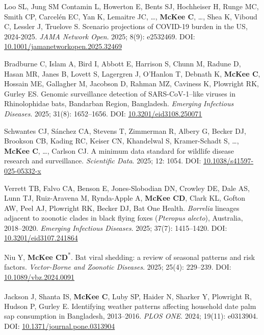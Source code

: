 \documentclass{cv}
\begin{document}
\begin{pubenum}
\item Loo SL, Jung SM Contamin L, Howerton E, Bents SJ, Hochheiser H, Runge MC, Smith CP, Carcelén EC, Yan K, Lemaitre JC, …, \textbf{McKee C}, …,  Shea K, Viboud C, Lessler J, Truelove S. Scenario projections of COVID-19 burden in the US, 2024-2025. \textit{JAMA Network Open}. 2025; 8(9): e2532469. DOI: \href{https://doi.org/10.1001/jamanetworkopen.2025.32469}{10.1001/jamanetworkopen.2025.32469}

\item Bradburne C, Islam A, Bird I, Abbott E, Harrison S, Chunn M, Radune D, Hasan MR, Janes B, Lovett S, Lagergren J, O'Hanlon T, Debnath K, \textbf{McKee C}, Hossain ME, Gallagher M, Jacobson D, Rahman MZ, Caviness K, Plowright RK, Gurley ES. Genomic surveillance detection of SARS-CoV-1--like viruses in Rhinolophidae bats, Bandarban Region, Bangladesh. \textit{Emerging Infectious Diseases}. 2025; 31(8): 1652--1656. DOI: \href{https://doi.org/10.3201/eid3108.250071}{10.3201/eid3108.250071}

\item Schwantes CJ, Sánchez CA, Stevens T, Zimmerman R, Albery G, Becker DJ, Brookson CB, Kading RC, Keiser CN, Khandelwal S, Kramer-Schadt S, …, \textbf{McKee C}, …, Carlson CJ.  A minimum data standard for wildlife disease research and surveillance. \textit{Scientific Data}. 2025; 12: 1054. DOI: \href{https://doi.org/10.1038/s41597-025-05332-x}{10.1038/s41597-025-05332-x}

\item Verrett TB, Falvo CA, Benson E, Jones-Slobodian DN, Crowley DE, Dale AS, Lunn TJ, Ruiz-Aravena M, Rynda-Apple A, \textbf{McKee CD}, Clark KL, Gofton AW, Peel AJ, Plowright RK, Becker DJ, Bat One Health. \textit{Borrelia} lineages adjacent to zoonotic clades in black flying foxes (\textit{Pteropus alecto}), Australia, 2018–2020.  \textit{Emerging Infectious Diseases}. 2025; 37(7): 1415--1420. DOI: \href{https://doi.org/10.3201/eid3107.241864}{10.3201/eid3107.241864}

\item Niu Y\textsuperscript{\ddag}, \textbf{McKee CD}\textsuperscript{*}. Bat viral shedding: a review of seasonal patterns and risk factors. \textit{Vector-Borne and Zoonotic Diseases}. 2025; 25(4): 229--239. DOI: \href{https://doi.org/10.1089/vbz.2024.0091}{10.1089/vbz.2024.0091}

\item Jackson J\textsuperscript{\ddag}, Shanta IS, \textbf{McKee C}, Luby SP, Haider N, Sharker Y, Plowright R, Hudson P, Gurley E. Identifying weather patterns affecting household date palm sap consumption in Bangladesh, 2013--2016. \textit{PLOS ONE}. 2024; 19(11): e0313904. DOI: \href{https://doi.org/10.1371/journal.pone.0313904}{10.1371/journal.pone.0313904}


\end{pubenum}
\end{document}
